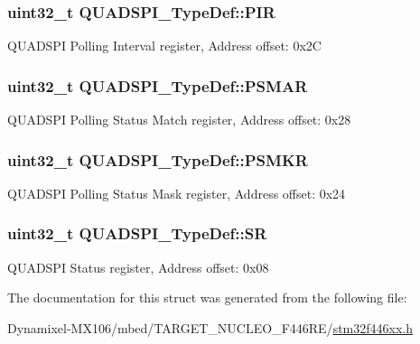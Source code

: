 \subsubsection[{\texorpdfstring{P\+IR}{PIR}}]{ uint32\+\_\+t Q\+U\+A\+D\+S\+P\+I\+\_\+\+Type\+Def\+::\+P\+IR}\hypertarget{struct_q_u_a_d_s_p_i___type_def_a75e800640a43256743699e865edcea91}{}\label{struct_q_u_a_d_s_p_i___type_def_a75e800640a43256743699e865edcea91}
Q\+U\+A\+D\+S\+PI Polling Interval register, Address offset\+: 0x2C 
\subsubsection[{\texorpdfstring{P\+S\+M\+AR}{PSMAR}}]{ uint32\+\_\+t Q\+U\+A\+D\+S\+P\+I\+\_\+\+Type\+Def\+::\+P\+S\+M\+AR}\hypertarget{struct_q_u_a_d_s_p_i___type_def_a380877fcd114e30bba84898c139ca540}{}\label{struct_q_u_a_d_s_p_i___type_def_a380877fcd114e30bba84898c139ca540}
Q\+U\+A\+D\+S\+PI Polling Status Match register, Address offset\+: 0x28 
\subsubsection[{\texorpdfstring{P\+S\+M\+KR}{PSMKR}}]{ uint32\+\_\+t Q\+U\+A\+D\+S\+P\+I\+\_\+\+Type\+Def\+::\+P\+S\+M\+KR}\hypertarget{struct_q_u_a_d_s_p_i___type_def_a834e5dc7b51e2ab38570f6fcc6343b16}{}\label{struct_q_u_a_d_s_p_i___type_def_a834e5dc7b51e2ab38570f6fcc6343b16}
Q\+U\+A\+D\+S\+PI Polling Status Mask register, Address offset\+: 0x24 
\subsubsection[{\texorpdfstring{SR}{SR}}]{ uint32\+\_\+t Q\+U\+A\+D\+S\+P\+I\+\_\+\+Type\+Def\+::\+SR}\hypertarget{struct_q_u_a_d_s_p_i___type_def_acbabc913eb6a81051e7a73297d1b0756}{}\label{struct_q_u_a_d_s_p_i___type_def_acbabc913eb6a81051e7a73297d1b0756}
Q\+U\+A\+D\+S\+PI Status register, Address offset\+: 0x08 

The documentation for this struct was generated from the following file\+:\begin{DoxyCompactItemize}
\item 
Dynamixel-\/\+M\+X106/mbed/\+T\+A\+R\+G\+E\+T\+\_\+\+N\+U\+C\+L\+E\+O\+\_\+\+F446\+R\+E/\hyperlink{stm32f446xx_8h}{stm32f446xx.\+h}\end{DoxyCompactItemize}
